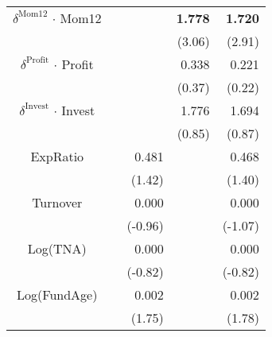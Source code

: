 \begin{singlespacing}
\begin{table}[H]
\begin{tabular}{crrrr}
$\delta^{\text{Mom12}}$ $\cdot$ Mom12              &                &                & \textbf{1.778}  & \textbf{1.720}  \\
                        &                &                & (3.06)          & (2.91)          \\
$\delta^{\text{Profit}}$ $\cdot$ Profit           &                &                & 0.338           & 0.221           \\
                        &                &                & (0.37)          & (0.22)          \\
$\delta^{\text{Invest}}$ $\cdot$ Invest            &                &                & 1.776           & 1.694           \\
                        &                &                & (0.85)          & (0.87)          \\
ExpRatio                &                & 0.481          &                 & 0.468           \\
                        &                & (1.42)         &                 & (1.40)          \\
Turnover                &                & 0.000          &                 & 0.000           \\
                        &                & (-0.96)        &                 & (-1.07)         \\
Log(TNA)                 &                & 0.000          &                 & 0.000           \\
                        &                & (-0.82)        &                 & (-0.82)         \\
Log(FundAge)             &                & 0.002          &                 & 0.002           \\
                        &                & (1.75)         &                 & (1.78)          \\ \hline
\end{tabular}
\end{table}
\end{singlespacing}

